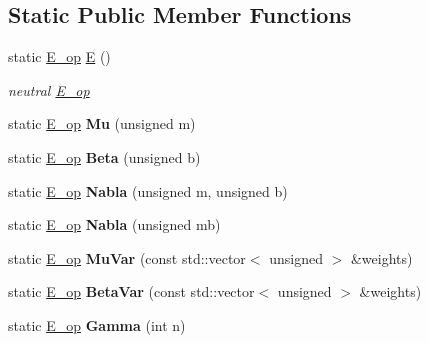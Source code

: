 \subsection*{Static Public Member Functions}
\begin{DoxyCompactItemize}
\item 
\mbox{\label{classetvo_i_i_1_1_e__op_a368857f7003ef93ed337174c343c64c5}} 
static \mbox{\hyperlink{classetvo_i_i_1_1_e__op}{E\+\_\+op}} \mbox{\hyperlink{classetvo_i_i_1_1_e__op_a368857f7003ef93ed337174c343c64c5}{E}} ()
\begin{DoxyCompactList}\small\item\em neutral \mbox{\hyperlink{classetvo_i_i_1_1_e__op}{E\+\_\+op}} \end{DoxyCompactList}\item 
\mbox{\label{classetvo_i_i_1_1_e__op_add7a9a5e024ad80ae12f4dbe886949ff}} 
static \mbox{\hyperlink{classetvo_i_i_1_1_e__op}{E\+\_\+op}} {\bfseries Mu} (unsigned m)
\item 
\mbox{\label{classetvo_i_i_1_1_e__op_a0d731b6cad91d18b38760ec9fe31301a}} 
static \mbox{\hyperlink{classetvo_i_i_1_1_e__op}{E\+\_\+op}} {\bfseries Beta} (unsigned b)
\item 
\mbox{\label{classetvo_i_i_1_1_e__op_a4614fb95f4f3be49f990e4b340e2b8f7}} 
static \mbox{\hyperlink{classetvo_i_i_1_1_e__op}{E\+\_\+op}} {\bfseries Nabla} (unsigned m, unsigned b)
\item 
\mbox{\label{classetvo_i_i_1_1_e__op_ac6824ede01bb3eafcac00f5d9475aaa5}} 
static \mbox{\hyperlink{classetvo_i_i_1_1_e__op}{E\+\_\+op}} {\bfseries Nabla} (unsigned mb)
\item 
\mbox{\label{classetvo_i_i_1_1_e__op_a642ba0bd8d28039f11d6bfae224fbc06}} 
static \mbox{\hyperlink{classetvo_i_i_1_1_e__op}{E\+\_\+op}} {\bfseries Mu\+Var} (const std\+::vector$<$ unsigned $>$ \&weights)
\item 
\mbox{\label{classetvo_i_i_1_1_e__op_afc127fea6be30c7783ef6d56f04f407d}} 
static \mbox{\hyperlink{classetvo_i_i_1_1_e__op}{E\+\_\+op}} {\bfseries Beta\+Var} (const std\+::vector$<$ unsigned $>$ \&weights)
\item 
\mbox{\label{classetvo_i_i_1_1_e__op_a0730a54b29a7453ee305fe1317bd6a04}} 
static \mbox{\hyperlink{classetvo_i_i_1_1_e__op}{E\+\_\+op}} {\bfseries Gamma} (int n)
\end{DoxyCompactItemize}
